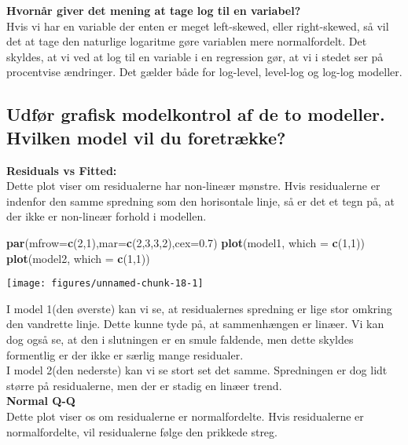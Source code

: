\documentclass[
  10pt,
]{article}
\newenvironment{Shaded}{\begin{snugshade}}{\end{snugshade}}
\newcommand{\DataTypeTok}[1]{\textcolor[rgb]{0.13,0.29,0.53}{#1}}
\newcommand{\DecValTok}[1]{\textcolor[rgb]{0.00,0.00,0.81}{#1}}
\newcommand{\FloatTok}[1]{\textcolor[rgb]{0.00,0.00,0.81}{#1}}
\newcommand{\KeywordTok}[1]{\textcolor[rgb]{0.13,0.29,0.53}{\textbf{#1}}}
\newcommand{\NormalTok}[1]{#1}
\begin{document}
\textbf{Hvornår giver det mening at tage log til en variabel?}\\
Hvis vi har en variable der enten er meget left-skewed, eller
right-skewed, så vil det at tage den naturlige logaritme gøre variablen
mere normalfordelt. Det skyldes, at vi ved at log til en variable i en
regression gør, at vi i stedet ser på procentvise ændringer. Det gælder
både for log-level, level-log og log-log modeller.

\hypertarget{udfuxf8r-grafisk-modelkontrol-af-de-to-modeller.-hvilken-model-vil-du-foretruxe6kke}{%
\subsection{Udfør grafisk modelkontrol af de to modeller. Hvilken model
vil du
foretrække?}\label{udfuxf8r-grafisk-modelkontrol-af-de-to-modeller.-hvilken-model-vil-du-foretruxe6kke}}

\leavevmode

\textbf{Residuals vs Fitted:}\\
Dette plot viser om residualerne har non-lineær mønstre. Hvis
residualerne er indenfor den samme spredning som den horisontale linje,
så er det et tegn på, at der ikke er non-lineær forhold i modellen.

\begin{Shaded}
\begin{Highlighting}[]
\KeywordTok{par}\NormalTok{(}\DataTypeTok{mfrow=}\KeywordTok{c}\NormalTok{(}\DecValTok{2}\NormalTok{,}\DecValTok{1}\NormalTok{),}\DataTypeTok{mar=}\KeywordTok{c}\NormalTok{(}\DecValTok{2}\NormalTok{,}\DecValTok{3}\NormalTok{,}\DecValTok{3}\NormalTok{,}\DecValTok{2}\NormalTok{),}\DataTypeTok{cex=}\FloatTok{0.7}\NormalTok{)}
\KeywordTok{plot}\NormalTok{(model1, }\DataTypeTok{which =} \KeywordTok{c}\NormalTok{(}\DecValTok{1}\NormalTok{,}\DecValTok{1}\NormalTok{))}
\KeywordTok{plot}\NormalTok{(model2, }\DataTypeTok{which =} \KeywordTok{c}\NormalTok{(}\DecValTok{1}\NormalTok{,}\DecValTok{1}\NormalTok{))}
\end{Highlighting}
\end{Shaded}

\begin{center}\texttt{[image: figures/unnamed-chunk-18-1]} \end{center}

I model 1(den øverste) kan vi se, at residualernes spredning er lige
stor omkring den vandrette linje. Dette kunne tyde på, at sammenhængen
er linæer. Vi kan dog også se, at den i slutningen er en smule faldende,
men dette skyldes formentlig er der ikke er særlig mange residualer.\\
I model 2(den nederste) kan vi se stort set det samme. Spredningen er
dog lidt større på residualerne, men der er stadig en linæer trend.\\
\newpage \textbf{Normal Q-Q }\\
Dette plot viser os om residualerne er normalfordelte. Hvis residualerne
er normalfordelte, vil residualerne følge den prikkede streg.
\end{document}
